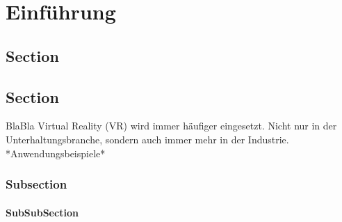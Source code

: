 \chapter{Einführung}

\section{Section}

\section{Section}
BlaBla\cite{Dummer2009}
Virtual Reality (VR) wird immer häufiger eingesetzt. Nicht nur in der Unterhaltungsbranche, sondern auch immer mehr in der Industrie. *Anwendungsbeispiele* 

\subsection{Subsection}

\subsubsection{SubSubSection}